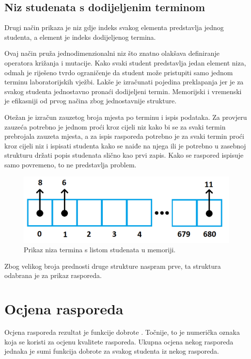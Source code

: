 \documentclass[times, utf8, zavrsni]{fer}
\begin{document}
\subsection{Niz studenata s dodijeljenim terminom}

Drugi način prikaza je niz gdje indeks svakog elementa predstavlja jednog studenta, a element je indeks dodijeljenog termina.

Ovaj način pruža jednodimenzionalni niz što znatno olakšava definiranje operatora križanja i mutacije. Kako svaki student predstavlja jedan element niza, odmah je riješeno tvrdo ograničenje da student može pristupiti samo jednom terminu laboratorijskih vježbi. Lakše je izračunati pojedina preklapanja jer je za svakog studenta jednostavno pronaći dodijeljeni termin. Memorijski i vremenski je efikasniji od prvog načina zbog jednostavnije strukture.

Otežan je izračun zauzetog broja mjesta po terminu i ispis podataka. Za provjeru zauzeća potrebno je jednom proći  kroz cijeli niz kako bi se za svaki termin prebrojala zauzeta mjesta, a za ispis rasporeda potrebno je za svaki termin proći kroz cijeli niz i ispisati studenta kako se naiđe na njega ili je potrebno u zasebnoj strukturu držati popis studenata slično kao prvi zapis. Kako se raspored ispisuje samo povremeno, to ne predstavlja problem.

\begin{figure}[htb]
\centering
\includegraphics[width=13cm]{images/prikaz_jednike_2.png}
\caption{Prikaz niza termina s listom studenata u memoriji.}
\label{fig:prikaz_jednike_2}
\end{figure}

Zbog velikog broja prednosti druge strukture naspram prve, ta struktura odabrana je za prikaz rasporeda.

\section{Ocjena rasporeda}

Ocjena rasporeda rezultat je funkcije dobrote . Točnije, to je numerička oznaka koja se koristi za ocjenu kvalitete rasporeda. Ukupna ocjena nekog rasporeda jednaka je sumi funkcija dobrote za svakog studenta iz nekog rasporeda.
\end{document}
